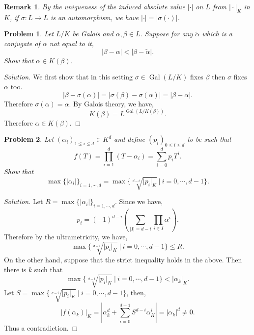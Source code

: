 \documentclass[8pt]{article}
\numberwithin{equation}{section}
\newenvironment{solution}{\begin{proof}[Solution]}{\end{proof}}
\newtheorem{remark}{Remark}[section]
\newtheorem{problem}{Problem}[section]
\DeclareMathOperator{\Gal}{Gal}
\newcommand{\sep}[0]{\:|\:}
\newcommand{\ab}[1]{\vert #1 \vert}
\begin{document}
\begin{remark}
  By the uniqueness of the induced absolute value $\ab{\cdot}$ on $L$ from $\ab{\cdot}_K$ in $K$, if $\sigma:L\to L$ is an automorphism, we have $\ab{\cdot} = \ab{\sigma(\cdot)}$.
\end{remark}
\begin{problem}
  Let $L/K$ be Galois and $\alpha,\beta\in L$. Suppose for any $\tilde{\alpha}$ which is a conjugate of $\alpha$ not equal to it, 
  \begin{equation*}
    \ab{\beta-\alpha}<\ab{\beta-\tilde{\alpha}}.
  \end{equation*}
  Show that $\alpha\in K(\beta)$.
\end{problem}
\begin{solution}
  We first show that in this setting $\sigma\in\Gal(L/K)$ fixes $\beta$ then $\sigma$ fixes $\alpha$ too.
  \begin{equation*}
    \ab{\beta-\sigma(\alpha)} =\ab{\sigma(\beta)-\sigma(\alpha)} = \ab{\beta-\alpha}. 
  \end{equation*}
  Therefore $\sigma(\alpha) = \alpha$. By Galois theory, we have,
  \begin{equation*}
    K(\beta) = L^{\Gal(L/K(\beta))}.
  \end{equation*}
  Therefore $\alpha\in K(\beta)$.
\end{solution}
\begin{problem}
  Let $(\alpha_i)_{1\leq i\leq d}\in K^d$ and define $(p_i)_{0\leq i\leq d}$ to be such that
  \begin{equation*}
    f(T) = \prod_{i=1}^d (T-\alpha_i) = \sum_{i=0}^d p_i T^i.
  \end{equation*}
  Show that 
  \begin{equation*}
    \max\{\ab{\alpha_i}\}_{i=1,\cdots,d} =\max\{\sqrt[d-i]{\ab{p_i}_K}\sep i=0,\cdots,d-1\}.
  \end{equation*}
\end{problem}
\begin{solution}
  Let $R = \max\{\ab{\alpha_i}\}_{i=1,\cdots,d}$. Since we have,
  \begin{equation*}
    p_i = (-1)^{d-i}\left(\sum_{\vert I\vert = d-i}\prod_{i\in I}\alpha^i\right).
  \end{equation*}
  Therefore by the ultrametricity, we have,
  \begin{equation*}
    \max\{\sqrt[d-i]{\ab{p_i}_K}\sep i=0,\cdots,d-1\}\leq R.
  \end{equation*}
  On the other hand, suppose that the strict inequality holds in the above. Then there is $k$ such that 
  \begin{equation*}
    \max\{\sqrt[d-i]{\ab{p_i}_K}\sep i=0,\cdots,d-1\}< \ab{\alpha_k}_K.
  \end{equation*}
  Let $S = \max\{\sqrt[d-i]{\ab{p_i}_K}\sep i=0,\cdots,d-1\}$, then,
  \begin{equation*}
    \ab{f(\alpha_k)}_K = \left\vert \alpha_k^d+\sum_{i=0}^{d-1} S^{d-i}\alpha_K^i\right\vert = \ab{\alpha_k}^d\not=0.
  \end{equation*}
Thus a contradiction.
\end{solution}
\end{document}
